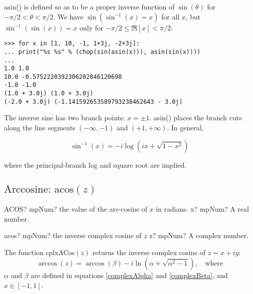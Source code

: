 asin() is defined so as to be a proper inverse function of $\sin(\theta)$ for $-\pi/2 < \theta < \pi/2$. We have $\sin(\sin^{-1}(x)=x)$ for all $x$, but $\sin^{-1}(\sin(x))=x$ only for $-\pi/2 \le \Re[x]<\pi/2$:

\begin{lstlisting}
>>> for x in [1, 10, -1, 1+3j, -2+3j]:
... print("%s %s" % (chop(sin(asin(x))), asin(sin(x))))
...
1.0 1.0
10.0 -0.5752220392306202846120698
-1.0 -1.0
(1.0 + 3.0j) (1.0 + 3.0j)
(-2.0 + 3.0j) (-1.141592653589793238462643 - 3.0j)
\end{lstlisting}

The inverse sine has two branch points: $x=\pm 1$. asin() places the branch cuts along the line segments $(-\infty,-1)$ and $(+1, +\infty)$. In general, 

\begin{equation}
	\sin^{-1}(x) = -i \log \left(ix + \sqrt{1-x^2} \right) 
\end{equation}

where the principal-branch log and square root are implied.




\newpage
\subsection{\texorpdfstring{$\text{Arccosine: acos}(z)$}{acos}}
\label{inverse complex cosine}

\begin{mpFunctionsExtract}
	\mpWorksheetFunctionOneNotImplemented
	{ACOS? mpNum? the value of the arc-cosine of $x$ in radians.}
	{x? mpNum? A real number.}
\end{mpFunctionsExtract}

\vspace{0.6cm}


\begin{mpFunctionsExtract}
	\mpFunctionOne
	{acos? mpNum? the inverse complex cosine of $z$}
	{z? mpNum? A complex number.}
\end{mpFunctionsExtract}

\vspace{0.3cm}
The function \textsf{cplxACos$(z)$} returns the inverse complex cosine of $z=x+iy$: 
\begin{equation}
	\arccos(z) = \arccos(\beta) - i \ln \left(\alpha + \sqrt{\alpha^2 -1}\right), \quad \text{where}
\end{equation}
$\alpha$ and $\beta$ are defined in equations \ref{complexAlpha} and \ref{complexBeta}, and $x \in [-1,1]$. 



